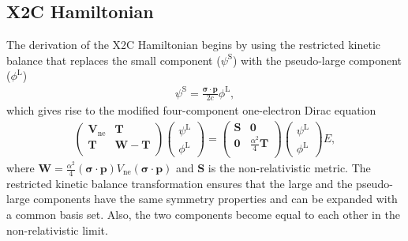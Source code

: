 \documentclass[10pt,aps,prb,twocolumn,amsmath,amssymb,superscriptaddress]{revtex4-1}
\renewcommand\b[1]{\ensuremath{\mathbf{#1}}}
\newcommand\B[1]  {\ensuremath{\pmb #1}}
\begin{document}
\subsection{X2C Hamiltonian}
The derivation of the X2C Hamiltonian begins by using the restricted kinetic balance\cite{StaHav-JCP-1984} that replaces the small component ($\psi^\text{S}$) with the pseudo-large component ($\phi^\text{L}$)
\begin{align}
\psi^\text{S}=\frac{\B{\sigma}\cdot\b{p}}{2c}\phi^\text{L}
,\end{align}
which gives rise to the modified four-component one-electron Dirac equation
\begin{align}
    \begin{pmatrix}
        \b{V}_\text{ne}& \b{T}\\
\b{T}& \b{W} - \b{T}\\
\end{pmatrix} \begin{pmatrix}\psi^\text{L}\\ \phi^\text{L}\end{pmatrix} = \begin{pmatrix}
    \b{S}& \b{0}\\
    \b{0}& \frac{\alpha^2}{4}\b{T}\\
\end{pmatrix} \begin{pmatrix}\psi^\text{L}\\ \phi^\text{L}\end{pmatrix}E
\label{eq:modDirac}
,\end{align}
where $\b{W} = \frac{\alpha^2}{4}(\B{\sigma}\cdot\b{p}) V_\text{ne} (\B{\sigma}\cdot\b{p})$ and $\b{S}$ is the non-relativistic metric. The restricted kinetic balance transformation ensures that the large and the pseudo-large components have the same symmetry properties and can be expanded with a common basis set. Also, the two components become equal to each other in the non-relativistic limit.
\end{document}
